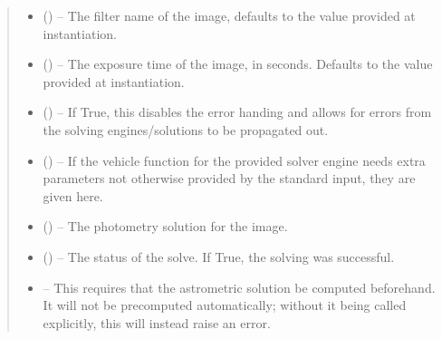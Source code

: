 \documentclass[letterpaper,11pt,english]{sphinxmanual}
\begin{document}
\begin{savenotes}
\begin{fulllineitems}
\begin{savenotes}
\begin{fulllineitems}
\begin{quote}
\begin{description}
\begin{itemize}
\item {} 
\sphinxAtStartPar
{} (\sphinxstyleliteralemphasis{\sphinxupquote{, }}) – The filter name of the image, defaults to the value provided at
instantiation.

\item {} 
\sphinxAtStartPar
{} (\sphinxstyleliteralemphasis{\sphinxupquote{, }}) – The exposure time of the image, in seconds. Defaults to the value
provided at instantiation.

\item {} 
\sphinxAtStartPar
{} (\sphinxstyleliteralemphasis{\sphinxupquote{, }}) – If True, this disables the error handing and allows for errors from
the solving engines/solutions to be propagated out.

\item {} 
\sphinxAtStartPar
{} (\sphinxstyleliteralemphasis{\sphinxupquote{, }}) – If the vehicle function for the provided solver engine needs
extra parameters not otherwise provided by the standard input,
they are given here.

\end{itemize}

\sphinxAtStartPar
\begin{itemize}
\item {} 
\sphinxAtStartPar
{} () – The photometry solution for the image.

\item {} 
\sphinxAtStartPar
{} () – The status of the solve. If True, the solving was successful.

\item {} 
\sphinxAtStartPar
{} – This requires that the astrometric solution be computed
before\sphinxhyphen{}hand. It will not be precomputed automatically; without it
being called explicitly, this will instead raise an error.


\end{itemize}
\end{description}
\end{quote}
\end{fulllineitems}
\end{savenotes}
\end{fulllineitems}
\end{savenotes}
\end{document}

